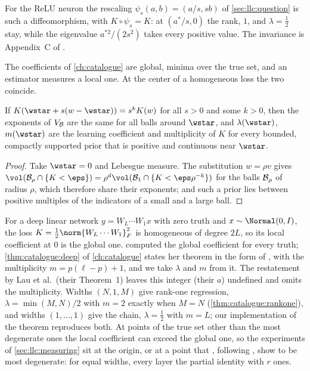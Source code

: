 \begin{refsection}
For the ReLU neuron the rescaling $\psi_s(a,b)=(a/s,sb)$ of \cref{sec:llc:question} is such a diffeomorphism, with $K\circ\psi_s=K$: at $(a^*/s,0)$ the rank, $1$, and $\lambda=\tfrac12$ stay, while the eigenvalue $a^{*2}/(2s^2)$ takes every positive value. The invariance is Appendix~C of \textcite{LauEtAl2025}.

The coefficients of \cref{ch:catalogue} are global, minima over the true set, and an estimator measures a local one. At the center of a homogeneous loss the two coincide.

\begin{lemma}\label{lem:llc:homogeneous}
If $K(\wstar+s(w-\wstar))=s^kK(w)$ for all $s>0$ and some $k>0$, then the exponents of $V_{\mathcal{B}}$ are the same for all balls around $\wstar$, and $\lambda(\wstar)$, $m(\wstar)$ are the learning coefficient and multiplicity of $K$ for every bounded, compactly supported prior that is positive and continuous near $\wstar$.
\end{lemma}

\begin{proof}
Take $\wstar=0$ and Lebesgue measure. The substitution $w=\rho v$ gives $\vol(\llcB_\rho\cap\{K<\eps\})=\rho^d\vol(\llcB_1\cap\{K<\eps\rho^{-k}\})$ for the balls $\mathcal{B}_\rho$ of radius $\rho$, which therefore share their exponents; and such a prior lies between positive multiples of the indicators of a small and a large ball.
\end{proof}

For a deep linear network $y=W_L\cdots W_1x$ with zero truth and $x\sim\Normal(0,I)$, the loss $K=\tfrac12\norm{W_L\cdots W_1}_F^2$ is homogeneous of degree $2L$, so its local coefficient at $0$ is the global one. \Textcite{Aoyagi2024} computed the global coefficient for every truth; \cref{thm:catalogue:deep} of \cref{ch:catalogue} states her theorem in the form of \textcite[Definition~4]{Aoyagi2025}, with the multiplicity $m=p(\ell-p)+1$, and we take $\lambda$ and $m$ from it. The restatement by Lau et al.\ (their Theorem~1) leaves this integer (their $a$) undefined and omits the multiplicity. Widths $(N,1,M)$ give rank-one regression, $\lambda=\min(M,N)/2$ with $m=2$ exactly when $M=N$ (\cref{thm:catalogue:rankone}), and widths $(1,\dots,1)$ give the chain, $\lambda=\tfrac12$ with $m=L$; our implementation of the theorem reproduces both. At points of the true set other than the most degenerate ones the local coefficient can exceed the global one, so the experiments of \cref{sec:llc:measuring} sit at the origin, or at a point that \textcite{HitchcockHoogland2025}, following \textcite{PepinLehalleurRimanyi2024}, show to be most degenerate: for equal widths, every layer the partial identity with $r$ ones.


\end{refsection}
